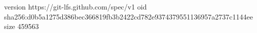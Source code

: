 version https://git-lfs.github.com/spec/v1
oid sha256:d0b5a1275d386bec366819fb3b2422cd782e9374379551136957a2737c1144ee
size 459563
